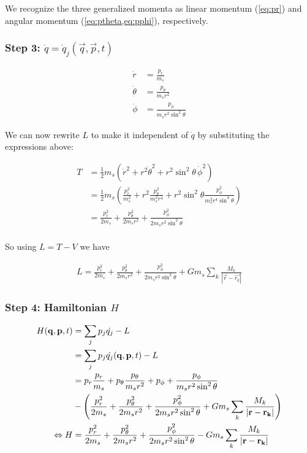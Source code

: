 We recognize the three generalized momenta as linear momentum (\cref{eq:pr}) and angular momentum (\cref{eq:ptheta,eq:pphi}), respectively.

\subsubsection{Step 3: \(\dot{q} = \dot{q}_j(\vec{q}, \vec{p}, t)\)}
\begin{align}
    \dot{r} &= \frac{p_r}{m_s} \\
    \dot{\theta} &= \frac{p_\theta}{m_s r^2} \\
    \dot{\phi} &= \frac{p_\phi}{m_s r^2 \sin^2{\theta}}
\end{align}

We can now rewrite \(L\) to make it independent of \(\dot{q}\) by substituting the expressions above:

\begin{align}
    T &= \frac{1}{2} m_s (\dot{r}^2 + r^2\dot{\theta}^2 + r^2\sin^2{\theta}\,\dot{\phi}^2) \\
    &= \frac{1}{2} m_s \left(\frac{p_r^2}{m_s^2} + r^2\frac{p_\theta^2}{m_s^2 r^4} + r^2\sin^2{\theta}\frac{p_\phi^2}{m_s^2 r^4 \sin^4{\theta}} \right) \\
    &= \frac{p_r^2}{2 m_s} + \frac{p_\theta^2}{2 m_s r^2} + \frac{p_\phi^2}{2 m_s r^2 \sin^2{\theta}} \\
\end{align}

So using \(L = T - V\) we have

\begin{align}
    L = \frac{p_r^2}{2 m_s} + \frac{p_\theta^2}{2 m_s r^2} + \frac{p_\phi^2}{2 m_s r^2 \sin^2{\theta}} + G m_s \sum\limits_{k} \frac{M_k}{\left| \vec{r} - \vec{r_k} \right|}
\end{align}

\subsubsection{Step 4: Hamiltonian \(H\)}
\begin{align}
    H(\vec{q}, \vec{p}, t) &= \sum\limits_{j}p_j \dot{q_j} - L \\
    &= \sum\limits_{j}p_j \dot{q_j}(\vec{q}, \vec{p}, t) - L \\
    &= p_r \frac{p_r}{m_s} + p_\theta \frac{p_\theta}{m_s r^2} + p_\phi + \frac{p_\phi}{m_s r^2 \sin^2{\theta}} \notag \\
    &- \left( \frac{p_r^2}{2 m_s} + \frac{p_\theta^2}{2 m_s r^2} + \frac{p_\phi^2}{2 m_s r^2 \sin^2{\theta}} + G m_s \sum\limits_{k} \frac{M_k}{\left| \vec{r} - \vec{r_k} \right|} \right) \\
    \Leftrightarrow H &= \frac{p_r^2}{2 m_s} + \frac{p_\theta^2}{2 m_s r^2} + \frac{p_\phi^2}{2 m_s r^2 \sin^2{\theta}} - G m_s \sum\limits_{k} \frac{M_k}{\left| \vec{r} - \vec{r_k} \right|}
\end{align}

